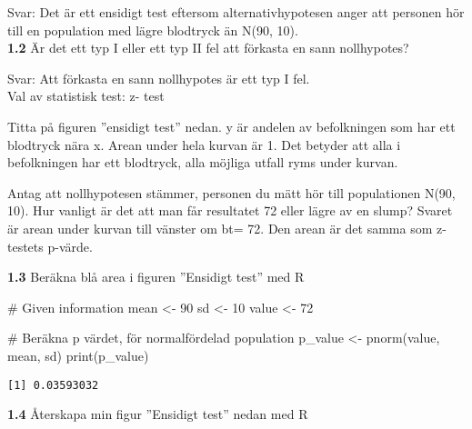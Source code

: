 \documentclass[
  letterpaper,
  DIV=11,
  numbers=noendperiod]{scrartcl}
\newenvironment{Shaded}{\begin{snugshade}}{\end{snugshade}}
\newcommand{\CommentTok}[1]{\textcolor[rgb]{0.37,0.37,0.37}{#1}}
\newcommand{\DecValTok}[1]{\textcolor[rgb]{0.68,0.00,0.00}{#1}}
\newcommand{\FunctionTok}[1]{\textcolor[rgb]{0.28,0.35,0.67}{#1}}
\newcommand{\NormalTok}[1]{\textcolor[rgb]{0.00,0.23,0.31}{#1}}
\newcommand{\OtherTok}[1]{\textcolor[rgb]{0.00,0.23,0.31}{#1}}
\begin{document}
\hfill\break
Svar: Det är ett ensidigt test eftersom alternativhypotesen anger att
personen hör till en population med lägre blodtryck än N(90, 10).\\

\textbf{1.2} Är det ett typ I eller ett typ II fel att förkasta en sann
nollhypotes?

\hfill\break
Svar: Att förkasta en sann nollhypotes är ett typ I fel.\\

Val av statistisk test: z- test

Titta på figuren ''ensidigt test'' nedan. y är andelen av befolkningen
som har ett blodtryck nära x. Arean under hela kurvan är 1. Det betyder
att alla i befolkningen har ett blodtryck, alla möjliga utfall ryms
under kurvan.

Antag att nollhypotesen stämmer, personen du mätt hör till populationen
N(90, 10). Hur vanligt är det att man får resultatet 72 eller lägre av
en slump? Svaret är arean under kurvan till vänster om bt= 72. Den arean
är det samma som z-testets p-värde.

\textbf{1.3} Beräkna blå area i figuren ''Ensidigt test'' med R

\begin{Shaded}
\begin{Highlighting}[]
\CommentTok{\# Given information}
\NormalTok{mean }\OtherTok{\textless{}{-}} \DecValTok{90}
\NormalTok{sd }\OtherTok{\textless{}{-}} \DecValTok{10}
\NormalTok{value }\OtherTok{\textless{}{-}} \DecValTok{72}

\CommentTok{\# Beräkna p värdet, för normalfördelad population}
\NormalTok{p\_value }\OtherTok{\textless{}{-}} \FunctionTok{pnorm}\NormalTok{(value, mean, sd)}
\FunctionTok{print}\NormalTok{(p\_value)}
\end{Highlighting}
\end{Shaded}

\begin{verbatim}
[1] 0.03593032
\end{verbatim}

\textbf{1.4} Återskapa min figur ''Ensidigt test'' nedan med R
\end{document}
